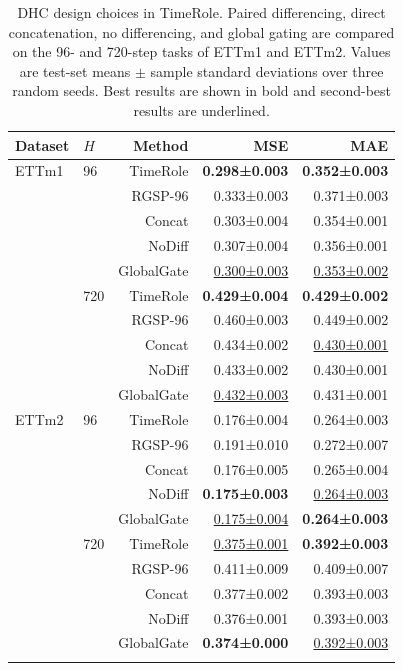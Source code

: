 \begin{table}[t]
\tablecaptionfont
\caption{DHC design choices in TimeRole. Paired differencing, direct concatenation, no differencing, and global gating are compared on the 96- and 720-step tasks of ETTm1 and ETTm2. Values are test-set means $\pm$ sample standard deviations over three random seeds. Best results are shown in bold and second-best results are underlined.}
\label{tab:design-choices}
\centering
\tablebodyfont
\setlength{\tabcolsep}{3pt}
\renewcommand{\arraystretch}{1.08}
\begin{tabular*}{\columnwidth}{@{\extracolsep{\fill}}llrrr@{}}
\toprule\noalign{}
Dataset & \(H\) & Method & MSE & MAE \\
\midrule\noalign{}
ETTm1 & 96 & TimeRole & \textbf{0.298±0.003} & \textbf{0.352±0.003} \\
& & RGSP-96 & 0.333±0.003 & 0.371±0.003 \\
& & Concat & 0.303±0.004 & 0.354±0.001 \\
& & NoDiff & 0.307±0.004 & 0.356±0.001 \\
& & GlobalGate & \underline{0.300±0.003} & \underline{0.353±0.002} \\
\addlinespace[1pt]
& 720 & TimeRole & \textbf{0.429±0.004} & \textbf{0.429±0.002} \\
& & RGSP-96 & 0.460±0.003 & 0.449±0.002 \\
& & Concat & 0.434±0.002 & \underline{0.430±0.001} \\
& & NoDiff & 0.433±0.002 & 0.430±0.001 \\
& & GlobalGate & \underline{0.432±0.003} & 0.431±0.001 \\
\midrule
ETTm2 & 96 & TimeRole & 0.176±0.004 & 0.264±0.003 \\
& & RGSP-96 & 0.191±0.010 & 0.272±0.007 \\
& & Concat & 0.176±0.005 & 0.265±0.004 \\
& & NoDiff & \textbf{0.175±0.003} & \underline{0.264±0.003} \\
& & GlobalGate & \underline{0.175±0.004} & \textbf{0.264±0.003} \\
\addlinespace[1pt]
& 720 & TimeRole & \underline{0.375±0.001} & \textbf{0.392±0.003} \\
& & RGSP-96 & 0.411±0.009 & 0.409±0.007 \\
& & Concat & 0.377±0.002 & 0.393±0.003 \\
& & NoDiff & 0.376±0.001 & 0.393±0.003 \\
& & GlobalGate & \textbf{0.374±0.000} & \underline{0.392±0.003} \\
\bottomrule\noalign{}
\end{tabular*}
\end{table}

